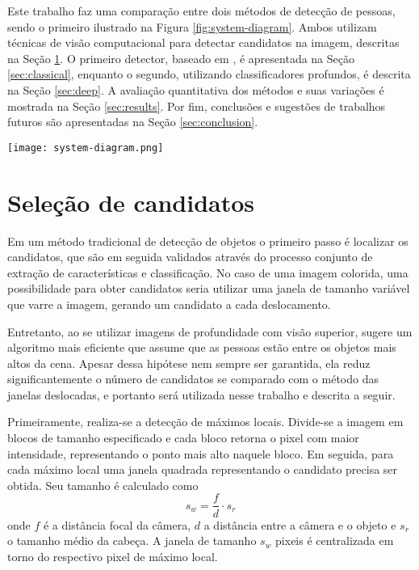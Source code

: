   Este trabalho faz uma comparação entre dois métodos de detecção de pessoas, sendo o primeiro ilustrado na Figura \ref{fig:system-diagram}. Ambos utilizam técnicas de visão computacional para detectar candidatos na imagem, descritas na Seção \ref{sec:candidates}. O primeiro detector, baseado em \cite{rauter}, é apresentada na Seção \ref{sec:classical}, enquanto o segundo, utilizando classificadores profundos, é descrita na Seção \ref{sec:deep}. A avaliação quantitativa dos métodos e suas variações é mostrada na Seção \ref{sec:results}. Por fim, conclusões e sugestões de trabalhos futuros são apresentadas na Seção \ref{sec:conclusion}.

  \begin{figure*}[!t]
  \centering
  \texttt{[image: system-diagram.png]}
  \caption{Diagrama do sistema de detecção de pessoas.}
  \label{fig:system-diagram}
  \end{figure*}

\section{Seleção de candidatos}
\label{sec:candidates}

    Em um método tradicional de detecção de objetos \cite{traditional-objdetect} o primeiro passo é localizar os candidatos, que são em seguida validados através do processo conjunto de extração de características e classificação. No caso de uma imagem colorida, uma possibilidade para obter candidatos seria utilizar uma janela de tamanho variável que varre a imagem, gerando um candidato a cada deslocamento.

    Entretanto, ao se utilizar imagens de profundidade com visão superior, \cite{rauter} sugere um algoritmo mais eficiente que assume que as pessoas estão entre os objetos mais altos da cena. Apesar dessa hipótese nem sempre ser garantida, ela reduz significantemente o número de candidatos se comparado com o método das janelas deslocadas, e portanto será utilizada nesse trabalho e descrita a seguir.

    Primeiramente, realiza-se a detecção de máximos locais. Divide-se a imagem em blocos de tamanho especificado e cada bloco retorna o pixel com maior intensidade, representando o ponto mais alto naquele bloco. Em seguida, para cada máximo local uma janela quadrada representando o candidato precisa ser obtida. Seu tamanho é calculado como
    \begin{equation}
      s_w = \frac{f}{d} \cdot s_r
    \end{equation}
    onde $f$ é a distância focal da câmera, $d$ a distância entre a câmera e o objeto e $s_r$ o tamanho médio da cabeça. A janela de tamanho $s_w$ pixeis é centralizada em torno do respectivo pixel de máximo local.

